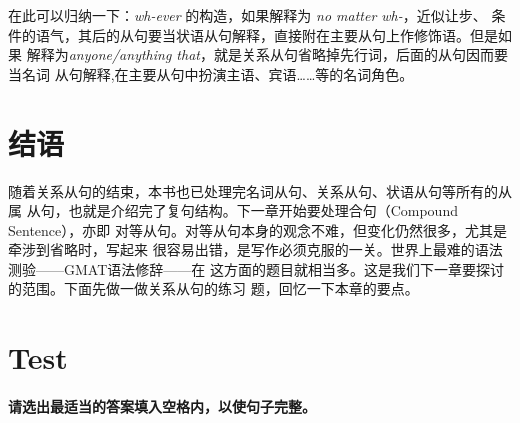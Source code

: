 在此可以归纳一下：\emph{wh-ever} 的构造，如果解释为 \emph{no matter wh-}，近似让步、
条件的语气，其后的从句要当状语从句解释，直接附在主要从句上作修饰语。但是如果
解释为\emph{anyone/anything that}，就是关系从句省略掉先行词，后面的从句因而要当名词
从句解释,在主要从句中扮演主语、宾语……等的名词角色。

\section{结语}

随着关系从句的结束，本书也已处理完名词从句、关系从句、状语从句等所有的从属
从句，也就是介绍完了复句结构。下一章开始要处理合句（Compound Sentence），亦即
对等从句。对等从句本身的观念不难，但变化仍然很多，尤其是牵涉到省略时，写起来
很容易出错，是写作必须克服的一关。世界上最难的语法测验——GMAT语法修辞——在
这方面的题目就相当多。这是我们下一章要探讨的范围。下面先做一做关系从句的练习
题，回忆一下本章的要点。

\section{Test}

\paragraph{请选出最适当的答案填入空格内，以使句子完整。}

